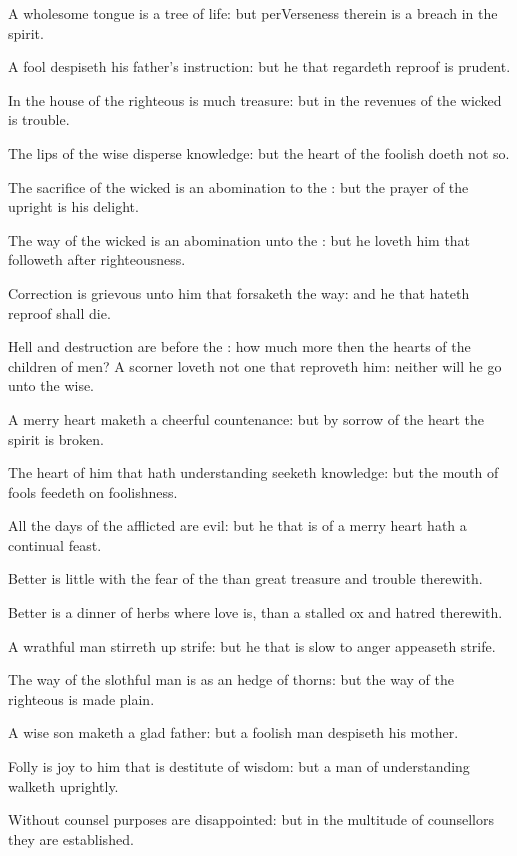 \Verse A wholesome tongue is a tree of life: but perVerseness therein is a breach in the spirit.

\Verse A fool despiseth his father's instruction: but he that regardeth reproof is prudent.

\Verse In the house of the righteous is much treasure: but in the revenues of the wicked is trouble.

\Verse The lips of the wise disperse knowledge: but the heart of the foolish doeth not so.

\Verse The sacrifice of the wicked is an abomination to the \LORD: but the prayer of the upright is his delight.

\Verse The way of the wicked is an abomination unto the \LORD: but he loveth him that followeth after righteousness.

\Verse Correction is grievous unto him that forsaketh the way: and he that hateth reproof shall die.

\Verse Hell and destruction are before the \LORD: how much more then the hearts of the children of men?  \Verse A scorner loveth not one that reproveth him: neither will he go unto the wise.

\Verse A merry heart maketh a cheerful countenance: but by sorrow of the heart the spirit is broken.

\Verse The heart of him that hath understanding seeketh knowledge: but the mouth of fools feedeth on foolishness.

\Verse All the days of the afflicted are evil: but he that is of a merry heart hath a continual feast.

\Verse Better is little with the fear of the \LORD than great treasure and trouble therewith.

\Verse Better is a dinner of herbs where love is, than a stalled ox and hatred therewith.

\Verse A wrathful man stirreth up strife: but he that is slow to anger appeaseth strife.

\Verse The way of the slothful man is as an hedge of thorns: but the way of the righteous is made plain.

\Verse A wise son maketh a glad father: but a foolish man despiseth his mother.

\Verse Folly is joy to him that is destitute of wisdom: but a man of understanding walketh uprightly.

\Verse Without counsel purposes are disappointed: but in the multitude of counsellors they are established.

